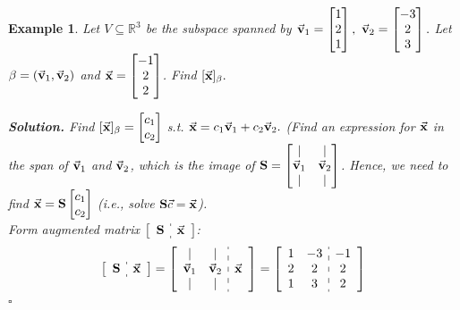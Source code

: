 \documentclass[12pt, a4paper]{article}
\newtheorem{eg}{Example}[subsection]
\newenvironment*{sol}{\par\indent\textbf{\textit{Solution. }}}{\hfill{$\square$}\par}
\def\R{{\mathbb{R}}}
\def\vecx{\va{x}}
\def\vecv{\va{v}}
\def\matrixS{\vb{S}}
\begin{document}
\begin{eg}
	Let $V\subseteq\R^3$ be the subspace spanned by $\vecv_1=\begin{bmatrix}1\\2\\1\end{bmatrix},\ \vecv_2=\begin{bmatrix}-3\\2\\3\end{bmatrix}.$ Let $\beta=(\vecv_1,\vecv_2)$ and $\vecx=\begin{bmatrix}-1\\2\\2\end{bmatrix}$. Find $[\vecx]_\beta.$	\\
	\begin{sol}
		Find $[\vecx]_\beta=\begin{bmatrix}c_1\\c_2\end{bmatrix}$ \emph{s.t.} $\vecx=c_1\vecv_1+c_2\vecv_2.$ (Find an expression for $\vecx$ in the span of $\vecv_1$ and $\vecv_2$, which is the image of $\matrixS=\begin{bmatrix}|&|\\\vecv_1&\vecv_2\\|&|\end{bmatrix}$. Hence, we need to find $\vecx=\matrixS\begin{bmatrix}c_1\\c_2\end{bmatrix}$ (i.e., solve $\matrixS\vec{c}=\vecx$).\\
		Form augmented matrix $\left[\begin{array}{c:c}\matrixS&\vecx\end{array}\right]$: 
		$$\begin{aligned}
			\left[\begin{array}{c:c}\matrixS&\vecx\end{array}\right]&=\left[\begin{array}{c:c}\begin{matrix}|&|\\\vecv_1&\vecv_2\\|&|\end{matrix}&\vecx\end{array}\right]=\left[\begin{array}{c:c}\begin{matrix}1&-3\\2&2\\1&3\end{matrix}&\begin{matrix}-1\\2\\2\end{matrix}\end{array}\right]\\

\end{aligned}$$
\end{sol}
\end{eg}
\end{document}
